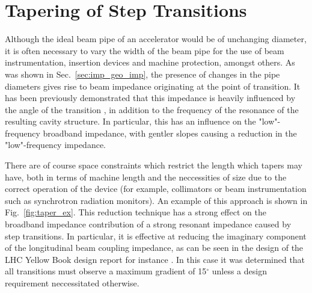 \section{Tapering of Step Transitions}
\label{sec:step_ins}

Although the ideal beam pipe of an accelerator would be of unchanging diameter, it is often necessary to vary the width of the beam pipe for the use of beam instrumentation, insertion devices and machine protection, amongst others. As was shown in Sec.~\ref{sec:imp_geo_imp}, the presence of changes in the pipe diameters gives rise to beam impedance originating at the point of transition. It has been previously demonstrated that this impedance is heavily influenced by the angle of the transition \cite{Podobedov:TaperedImp}, in addition to the frequency of the resonance of the resulting cavity structure. In particular, this has an influence on the "low"-frequency broadband impedance, with gentler slopes causing a reduction in the "low"-frequency impedance. 

There are of course space constraints which restrict the length which tapers may have, both in terms of machine length and the neccessities of size due to the correct operation of the device (for example, collimators or beam instrumentation such as synchrotron radiation monitors). An example of this approach is shown in Fig.~\ref{fig:taper_ex}. This reduction technique has a strong effect on the broadband impedance contribution of a strong resonant impedance caused by step transitions. In particular, it is effective at reducing the imaginary component of the longitudinal beam coupling impedance, as can be seen in the design of the LHC Yellow Book design report for instance \cite{Ruggiero:LHCColEff}. In this case it was determined that all transitions must observe a maximum gradient of 15$^{\circ}$ unless a design requirement neccessitated otherwise.

